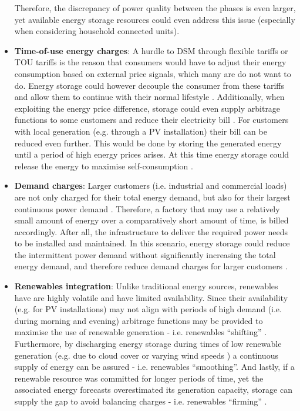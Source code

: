 \begin{itemize}
Therefore, the discrepancy of power quality between the phases is even larger, yet available energy storage resources could even address this issue \cite{Miret2009} (especially when considering household connected units).
\item
\textbf{Time-of-use energy charges}: A hurdle to DSM through flexible tariffs or TOU tariffs is the reason that consumers would have to adjust their energy consumption based on external price signals, which many are do not want to do.
Energy storage could however decouple the consumer from these tariffs and allow them to continue with their normal lifestyle \cite{Khani2014}.
Additionally, when exploiting the energy price difference, storage could even supply arbitrage functions to some customers and reduce their electricity bill \cite{Nair2010a}.
For customers with local generation (e.g. through a PV installation) their bill can be reduced even further.
This would be done by storing the generated energy until a period of high energy prices arises.
At this time energy storage could release the energy to maximise self-consumption \cite{Luthander2016}.
\item
\textbf{Demand charges}: Larger customers (i.e. industrial and commercial loads) are not only charged for their total energy demand, but also for their largest continuous power demand \cite{Oudalov2007, Mackey2013}.
Therefore, a factory that may use a relatively small amount of energy over a comparatively short amount of time, is billed accordingly.
After all, the infrastructure to deliver the required power needs to be installed and maintained.
In this scenario, energy storage could reduce the intermittent power demand without significantly increasing the total energy demand, and therefore reduce demand charges for larger customers \cite{Aghaei2013}.
\item
\textbf{Renewables integration}: Unlike traditional energy sources, renewables have are highly volatile and have limited availability.
Since their availability (e.g. for PV installations) may not align with periods of high demand (i.e. during morning and evening) arbitrage functions may be provided to maximise the use of renewable generation - i.e. renewables ``shifting'' \cite{Zakeri2015}.
Furthermore, by discharging energy storage during times of low renewable generation (e.g. due to cloud cover or varying wind speeds \cite{Jewell1987}) a continuous supply of energy can be assured - i.e. renewables ``smoothing''.
And lastly, if a renewable resource was committed for longer periods of time, yet the associated energy forecasts overestimated its generation capacity, storage can supply the gap to avoid balancing charges - i.e. renewables ``firming'' \cite{Chakraborty2012}.
\end{itemize}

